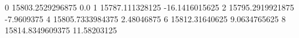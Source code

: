 0 15803.2529296875 0.0
1 15787.111328125 -16.1416015625
2 15795.2919921875 -7.9609375
4 15805.7333984375 2.48046875
6 15812.31640625 9.0634765625
8 15814.8349609375 11.58203125
